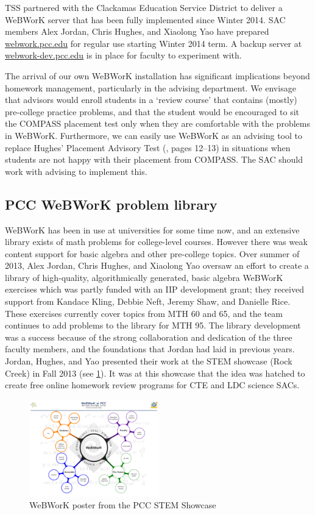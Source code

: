 TSS partnered with the Clackamas Education Service District to deliver a WeBWorK
server that has been fully implemented since Winter 2014.  SAC members Alex Jordan,
Chris Hughes, and Xiaolong Yao have prepared
\href{http://webwork.pcc.edu}{webwork.pcc.edu} for regular use starting Winter
2014 term. A backup server at
\href{http://webwork-dev.pcc.edu}{webwork-dev.pcc.edu} is in place for faculty
to experiment with. 

The arrival of our own WeBWorK installation has significant implications beyond
homework management, particularly in the advising department. We envisage that
advisors would enroll students in a `review course' that contains (mostly)
pre-college practice problems, and that the student would be encouraged to sit
the COMPASS placement test only when they are comfortable with the problems in
WeBWorK. Furthermore, we can easily use WeBWorK as an advising tool to replace
Hughes' Placement Advisory Test (\cite{mathprogramreview2003}, pages 12--13) in situations when students are not happy with
their placement from COMPASS.  The SAC should work with advising to implement
this. 

\subsection{PCC WeBWorK problem library}
WeBWorK has been in use at universities for some time now, and an extensive
library exists of math problems for college-level courses. However there was
weak content support for basic algebra and other pre-college topics. Over summer
of 2013, Alex Jordan, Chris Hughes, and Xiaolong Yao oversaw an effort to create
a library of high-quality, algorithmically generated, basic algebra WeBWorK
exercises which was partly funded with an IIP development grant; they received
support from Kandace Kling, Debbie Neft, Jeremy Shaw, and Danielle Rice.  These
exercises currently cover topics from MTH 60 and 65, and the team continues to
add problems to the library for MTH 95. The library development was a success
because of the strong collaboration and dedication of the three faculty members,
and the foundations that Jordan had laid in previous years. Jordan, Hughes,
and Yao presented their work at the STEM showcase (Rock Creek) in Fall 2013 (see
\cref{webworkposter}). It was at this showcase that the idea was hatched to
create free online homework review programs for CTE and LDC science SACs.

\begin{figure}[!htb]
	\centering
	\includegraphics[width=0.5\textwidth]{webworkposter.pdf}
	\caption{WeBWorK poster from the PCC STEM Showcase}\label{webworkposter}
\end{figure}

